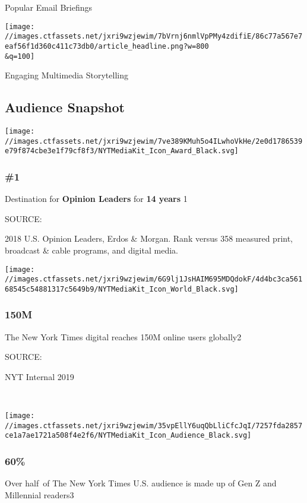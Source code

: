 Popular Email Briefings

\texttt{[image: //images.ctfassets.net/jxri9wzjewim/7bVrnj6nmlVpPMy4zdifiE/86c77a567e7eaf56f1d360c411c73db0/article\_headline.png?w=800\\\&q=100]}

Engaging Multimedia Storytelling

\hypertarget{audience-snapshot}{%
\subsection{Audience Snapshot}\label{audience-snapshot}}

\texttt{[image: //images.ctfassets.net/jxri9wzjewim/7ve389KMuh5o4ILwhoVkHe/2e0d1786539e79f874cbe3e1f79cf8f3/NYTMediaKit\_Icon\_Award\_Black.svg]}

\hypertarget{1}{%
\subsubsection{\#1}\label{1}}

Destination for \textbf{Opinion Leaders} for \textbf{14 years} 1

SOURCE:

2018 U.S. Opinion Leaders, Erdos \& Morgan. Rank versus 358 measured
print, broadcast \& cable programs, and digital media.

\texttt{[image: //images.ctfassets.net/jxri9wzjewim/6G9lj1JsHAIM695MDQdokF/4d4bc3ca56168545c54881317c5649b9/NYTMediaKit\_Icon\_World\_Black.svg]}

\hypertarget{150m}{%
\subsubsection{150M}\label{150m}}

The New York Times digital reaches 150M online users globally2

SOURCE:

NYT Internal 2019

﻿

\texttt{[image: //images.ctfassets.net/jxri9wzjewim/35vpEllY6uqQbLliCfcJqI/7257fda2857ce1a7ae1721a508f4e2f6/NYTMediaKit\_Icon\_Audience\_Black.svg]}

\hypertarget{60}{%
\subsubsection{60\%}\label{60}}

Over half~of The New York Times U.S. audience is made up of Gen Z and
Millennial readers3

